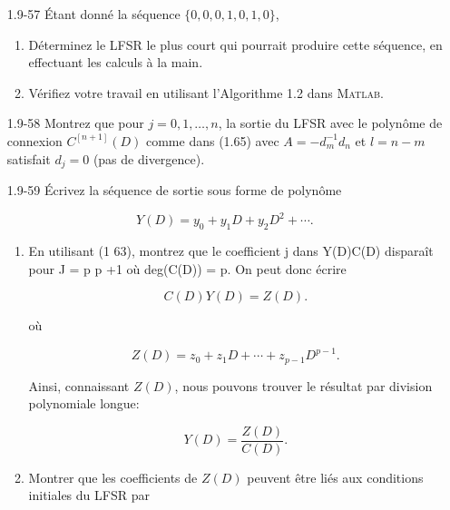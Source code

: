 \documentclass[10pt,twoside,a4paper]{book}
\begin{document}
\begin{enumerate}
  \item[1.9-57] Étant donné la séquence $\{0, 0, 0, 1, 0, 1, 0\}$,
  
  \begin{enumerate}
    \item Déterminez le LFSR le plus court qui pourrait produire cette séquence, en effectuant les calculs à la main.
    \item Vérifiez votre travail en utilisant l'Algorithme 1.2 dans \textsc{Matlab}.
  \end{enumerate}

  \item[1.9-58] Montrez que pour $j=0,1,\ldots,n$, la sortie du LFSR avec le polynôme de connexion $C^{[n+1]}(D)$ comme dans (1.65) avec $A=-d_m^{-1}d_n$ et $l=n-m$ satisfait $d_j = 0$ (pas de divergence).
  

  \item[1.9-59] Écrivez la séquence de sortie sous forme de polynôme
  
  \begin{equation*}
    Y(D)=y_0+y_1D+y_2 D^2 + \cdots .
  \end{equation*}

  \begin{enumerate}
    \item En utilisant (1 63), montrez que le coefficient j dans Y(D)C(D) disparaît pour J = p p +1 où deg(C(D)) = p. On peut donc écrire
    
    \begin{equation*}
      C(D)Y(D)=Z(D).
    \end{equation*}

    où

    \begin{equation*}
      Z(D)=z_0+z_1D+ \cdots +z_{p-1}D^{p-1}.
    \end{equation*}

    \noindent
    Ainsi, connaissant $Z(D)$, nous pouvons trouver le résultat par division polynomiale longue:

    \begin{equation}
      Y(D)= \frac{Z(D)}{C(D)}.
    \end{equation}

    \item Montrer que les coefficients de $Z(D)$ peuvent être liés aux conditions initiales du LFSR par
    

\end{enumerate}
\end{enumerate}
\end{document}
